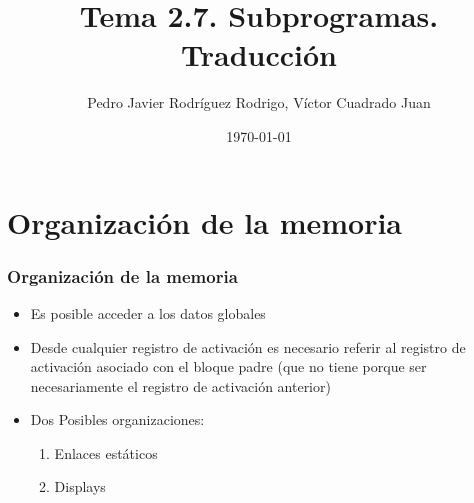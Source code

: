 \documentclass[hyperref={pdfpagelabels=false},tree-dvips]{beamer}
\title{Tema 2.7. Subprogramas. Traducción}
\author{Pedro Javier Rodríguez Rodrigo, Víctor Cuadrado Juan}
\date{\today}
\begin{document}
\begin{frame}
\titlepage
\end{frame}
\section{Organización de la memoria}
\begin{frame}[fragile]
\frametitle{Organización de la memoria}

\begin{itemize}[<+->]%
    \item Es posible acceder a los datos globales
    \item Desde cualquier registro de activación es necesario referir al registro de activación asociado con el bloque padre (que no tiene porque ser necesariamente el registro de activación anterior)
    \item Dos Posibles organizaciones:
        \begin{enumerate}[<+->]
            \item Enlaces estáticos
            \item Displays
        \end{enumerate}
\end{itemize}

\end{frame}
\end{document}
